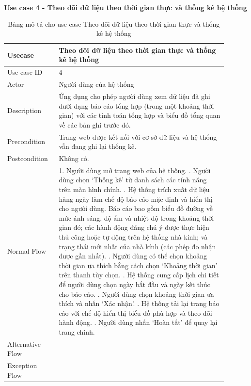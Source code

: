 \textbf{Use case 4 - Theo dõi dữ liệu theo thời gian thực và thống kê hệ thống}
\renewcommand{\arraystretch}{1.6}
\begin{table}[H]
\centering
\begin{tabular}{|p{0.2\linewidth}|p{0.7\linewidth}|}
\hline
\rowcolor[HTML]{EFEFEF} 
\textbf{Usecase}        & \textbf{Theo dõi dữ liệu theo thời gian thực và thống kê hệ thống} \\ \hline
Use case ID             & 4 \\ \hline
Actor                   & Người dùng của hệ thống \\ \hline
Description             & Ứng dụng cho phép người dùng xem dữ liệu đã ghi dưới dạng báo cáo tổng hợp (trong một khoảng thời gian) với các tính toán tổng hợp và biểu đồ tổng quan về các bản ghi trước đó. \\ \hline
Precondition            & Trang web được kết nối với cơ sở dữ liệu và hệ thống vẫn đang ghi lại thống kê. \\ \hline
Postcondition           & Không có.  \\ \hline
Normal Flow             & 
    1. Người dùng mở trang web của hệ thống. \newline
    2. Người dùng chọn `Thống kê' từ danh sách các tính năng trên màn hình chính. \newline
    3. Hệ thống trích xuất dữ liệu hàng ngày làm chế độ báo cáo mặc định và hiển thị cho người dùng. Báo cáo bao gồm biểu đồ đường về mức ánh sáng, độ ẩm và nhiệt độ trong khoảng thời gian đó; các hành động đáng chú ý được thực hiện thủ công hoặc tự động trên hệ thống nhà kính; và trạng thái mới nhất của nhà kính (các phép đo nhận được gần nhất). \newline
    4. Người dùng có thể chọn khoảng thời gian ưa thích bằng cách chọn `Khoảng thời gian' trên thanh tùy chọn. \newline
    5. Hệ thống cung cấp lịch chi tiết để người dùng chọn ngày bắt đầu và ngày kết thúc cho báo cáo. \newline
    6. Người dùng chọn khoảng thời gian ưa thích và nhấn `Xác nhận'. \newline
    7. Hệ thống tải lại trang báo cáo với chế độ hiển thị biểu đồ phù hợp và theo dõi hành động. \newline
    8. Người dùng nhấn `Hoàn tất' để quay lại trang chính.
\\ \hline
Alternative Flow          & 
\\ \hline
Exception Flow          &  
\\ \hline
\end{tabular}
\caption{Bảng mô tả cho use case Theo dõi dữ liệu theo thời gian thực và thống kê hệ thống}
\end{table}

